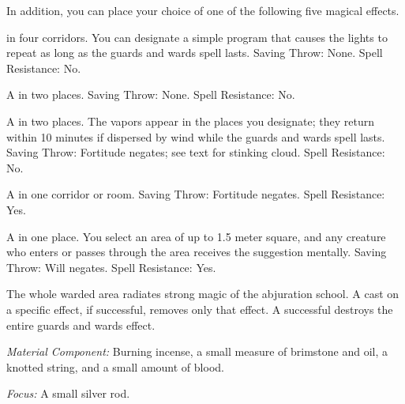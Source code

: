 {	In addition, you can place your choice of one of the following five magical effects.

	\begin{enumerate*}
		\item {} in four corridors. You can designate a simple program that causes the lights to repeat as long as the guards and wards spell lasts. Saving Throw: None. Spell Resistance: No.
		\item A  in two places. Saving Throw: None. Spell Resistance: No.
		\item A  in two places. The vapors appear in the places you designate; they return within 10 minutes if dispersed by wind while the guards and wards spell lasts. Saving Throw: Fortitude negates; see text for stinking cloud. Spell Resistance: No.
		\item A  in one corridor or room. Saving Throw: Fortitude negates. Spell Resistance: Yes.
		\item A  in one place. You select an area of up to 1.5 meter square, and any creature who enters or passes through the area receives the suggestion mentally. Saving Throw: Will negates. Spell Resistance: Yes.
	\end{enumerate*}

	The whole warded area radiates strong magic of the abjuration school. A  cast on a specific effect, if successful, removes only that effect. A successful  destroys the entire guards and wards effect.

	\textit{Material Component:}
	Burning incense, a small measure of brimstone and oil, a knotted string, and a small amount of blood.

	\textit{Focus:}
	A small silver rod.

}
